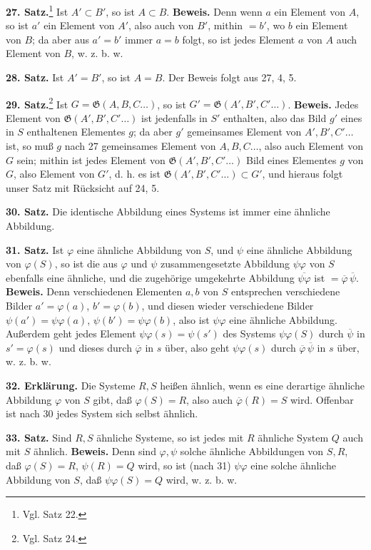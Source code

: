\documentclass[11pt]{article}
\newcommand{\Gf}{\mathfrak{G}}
\newcommand{\partof}{\mathrel{\subset}}
\begin{document}
\noindent\textbf{27. Satz.}\footnote{Vgl. Satz 22.} Ist $A'\partof B'$, so ist $A\partof B$. \textbf{Beweis.} Denn wenn $a$ ein Element von $A$, so ist $a'$ ein Element von $A'$, also auch von $B'$, mithin $=b'$, wo $b$ ein Element von $B$; da aber aus $a'=b'$ immer $a=b$ folgt, so ist jedes Element $a$ von $A$ auch Element von $B$, w. z. b. w.

\noindent\textbf{28. Satz.} Ist $A'=B'$, so ist $A=B$. Der Beweis folgt aus 27, 4, 5.

\noindent\textbf{29. Satz.}\footnote{Vgl. Satz 24.} Ist $G=\Gf(A,B,C\ldots)$, so ist $G'=\Gf(A',B',C'\ldots)$. \textbf{Beweis.} Jedes Element von $\Gf(A',B',C'\ldots)$ ist jedenfalls in $S'$ enthalten, also das Bild $g'$ eines in $S$ enthaltenen Elementes $g$; da aber $g'$ gemeinsames Element von $A',B',C'\ldots$ ist, so muß $g$ nach 27 gemeinsames Element von $A,B,C\ldots$, also auch Element von $G$ sein; mithin ist jedes Element von $\Gf(A',B',C'\ldots)$ Bild eines Elementes $g$ von $G$, also Element von $G'$, d. h. es ist $\Gf(A',B',C'\ldots)\partof G'$, und hieraus folgt unser Satz mit Rücksicht auf 24, 5.

\noindent\textbf{30. Satz.} Die identische Abbildung eines Systems ist immer eine ähnliche Abbildung.

\noindent\textbf{31. Satz.} Ist $\varphi$ eine ähnliche Abbildung von $S$, und $\psi$ eine ähnliche Abbildung von $\varphi(S)$, so ist die aus $\varphi$ und $\psi$ zusammengesetzte Abbildung $\psi\varphi$ von $S$ ebenfalls eine ähnliche, und die zugehörige umgekehrte Abbildung $\overline{\psi\varphi}$ ist $=\overline{\varphi}\,\overline{\psi}$. \textbf{Beweis.} Denn verschiedenen Elementen $a,b$ von $S$ entsprechen verschiedene Bilder $a'=\varphi(a)$, $b'=\varphi(b)$, und diesen wieder verschiedene Bilder $\psi(a')=\psi\varphi(a)$, $\psi(b')=\psi\varphi(b)$, also ist $\psi\varphi$ eine ähnliche Abbildung. Außerdem geht jedes Element $\psi\varphi(s)=\psi(s')$ des Systems $\psi\varphi(S)$ durch $\overline{\psi}$ in $s'=\varphi(s)$ und dieses durch $\overline{\varphi}$ in $s$ über, also geht $\psi\varphi(s)$ durch $\overline{\varphi}\,\overline{\psi}$ in $s$ über, w. z. b. w.

\noindent\textbf{32. Erklärung.} Die Systeme $R,S$ heißen ähnlich, wenn es eine derartige ähnliche Abbildung $\varphi$ von $S$ gibt, daß $\varphi(S)=R$, also auch $\overline{\varphi}(R)=S$ wird. Offenbar ist nach 30 jedes System sich selbst ähnlich.

\noindent\textbf{33. Satz.} Sind $R,S$ ähnliche Systeme, so ist jedes mit $R$ ähnliche System $Q$ auch mit $S$ ähnlich. \textbf{Beweis.} Denn sind $\varphi,\psi$ solche ähnliche Abbildungen von $S,R$, daß $\varphi(S)=R$, $\psi(R)=Q$ wird, so ist (nach 31) $\psi\varphi$ eine solche ähnliche Abbildung von $S$, daß $\psi\varphi(S)=Q$ wird, w. z. b. w.
\end{document}
